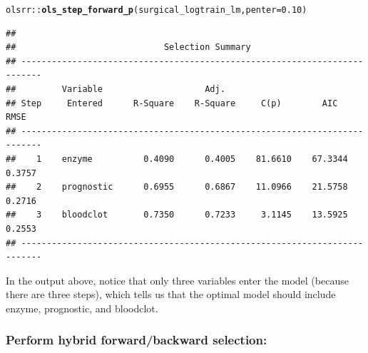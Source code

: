 \documentclass{article}\usepackage[]{graphicx}\usepackage[]{color}
\makeatletter
\newcommand{\hlnum}[1]{\textcolor[rgb]{0.686,0.059,0.569}{#1}}%
\newcommand{\hlopt}[1]{\textcolor[rgb]{0,0,0}{#1}}%
\newcommand{\hlstd}[1]{\textcolor[rgb]{0.345,0.345,0.345}{#1}}%
\newcommand{\hlkwc}[1]{\textcolor[rgb]{0.333,0.667,0.333}{#1}}%
\newcommand{\hlkwd}[1]{\textcolor[rgb]{0.737,0.353,0.396}{\textbf{#1}}}%
\newenvironment{kframe}{%
 \def\at@end@of@kframe{}%
 \ifinner\ifhmode%
  \def\at@end@of@kframe{\end{minipage}}%
  \begin{minipage}{\columnwidth}%
 \fi\fi%
 \def\FrameCommand##1{\hskip\@totalleftmargin \hskip-\fboxsep
 \colorbox{shadecolor}{##1}\hskip-\fboxsep
     \hskip-\linewidth \hskip-\@totalleftmargin \hskip\columnwidth}%
 \MakeFramed {\advance\hsize-\width
   \@totalleftmargin\z@ \linewidth\hsize
   \@setminipage}}%
 {\par\unskip\endMakeFramed%
 \at@end@of@kframe}
\newenvironment{knitrout}{}{} %
\makeatother
\begin{document}
\begin{knitrout}
\color{fgcolor}\begin{kframe}
\begin{alltt}
\hlstd{olsrr}\hlopt{::}\hlkwd{ols_step_forward_p}\hlstd{(surgical_logtrain_lm,} \hlkwc{penter} \hlstd{=} \hlnum{0.10}\hlstd{)}
\end{alltt}
\begin{verbatim}
## 
##                             Selection Summary                              
## --------------------------------------------------------------------------
##         Variable                    Adj.                                      
## Step     Entered      R-Square    R-Square     C(p)        AIC       RMSE     
## --------------------------------------------------------------------------
##    1    enzyme          0.4090      0.4005    81.6610    67.3344    0.3757    
##    2    prognostic      0.6955      0.6867    11.0966    21.5758    0.2716    
##    3    bloodclot       0.7350      0.7233     3.1145    13.5925    0.2553    
## --------------------------------------------------------------------------
\end{verbatim}
\end{kframe}
\end{knitrout}

In the output above, notice that only three variables enter the model (because there are three steps), which tells us that the optimal model should include enzyme, prognostic, and bloodclot.

\subsubsection*{Perform hybrid forward/backward selection:}
\end{document}
